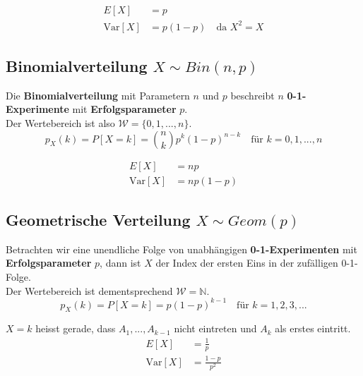 \documentclass[11pt]{article}
\newcommand{\Var}{\text{Var}}
\begin{document}
\begin{equation*}
\begin{split}
	E[X] & = p \\
	\Var[X] & = p(1-p) \quad \text{da } X^2 = X
\end{split}
\end{equation*}

\subsection{Binomialverteilung $X \sim Bin(n,p)$}

Die \textbf{Binomialverteilung} mit Parametern $n$ und $p$ beschreibt $n$ \textbf{0-1-Experimente} mit \textbf{Erfolgsparameter} $p$. \\
Der Wertebereich ist also $\mathcal{W} = \{0, 1, ..., n\}$.
\begin{equation*}
	p_X(k) = P[X = k] = \binom{n}{k}p^k(1-p)^{n-k} \quad\text{f{\"u}r } k = 0, 1, ..., n
\end{equation*}

\begin{equation*}
\begin{split}
	E[X] & = np \\
	\Var[X] & = np(1-p)
\end{split}
\end{equation*}

\subsection{Geometrische Verteilung $X \sim Geom(p)$}

Betrachten wir eine unendliche Folge von unabh{\"a}ngigen \textbf{0-1-Experimenten} mit \textbf{Erfolgsparameter} $p$, dann ist $X$ der Index der ersten Eins in der zuf{\"a}lligen 0-1-Folge. \\
Der Wertebereich ist dementsprechend $\mathcal{W} = \mathbb{N}$.
\begin{equation*}
	p_X(k) = P[X = k] = p(1-p)^{k-1} \quad\text{f{\"u}r } k = 1, 2, 3,...
\end{equation*}

$X = k$ heisst gerade, dass $A_1,..., A_{k-1}$ nicht eintreten und $A_k$ als erstes eintritt.
\begin{equation*}
\begin{split}
	E[X] & = \frac{1}{p} \\
	\Var[X] & = \frac{1-p}{p^2}
\end{split}
\end{equation*}
\end{document}

